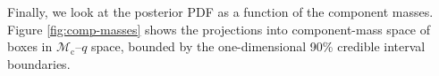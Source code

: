 Finally, we look at the posterior PDF as a function of the component masses.  Figure \ref{fig:comp-masses} shows the projections into component-mass space of boxes in $\mathcal{M}_\mathrm{c}$--$q$ space, bounded by the one-dimensional 90\% credible interval boundaries.